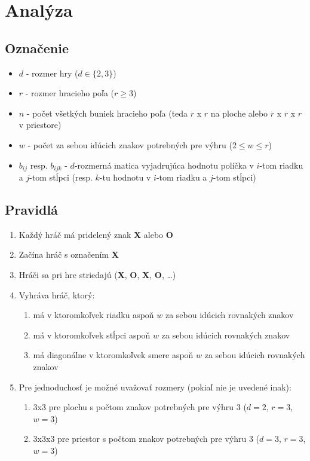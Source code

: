 \section{Analýza}\label{sec:analysis}

\subsection{Označenie}\label{subsec:label}

\begin{itemize}
    \item $d$ - rozmer hry ($d \in \{2,3\}$)
    \item $r$ - rozmer hracieho poľa ($r \geq 3$)
    \item $n$ - počet všetkých buniek hracieho poľa (teda $r$ x $r$ na ploche alebo $r$ x $r$ x $r$ v priestore)
    \item $w$ - počet za sebou idúcich znakov potrebných pre výhru ($2 \leq w \leq r$)
    \item $b_{ij}$ resp. $b_{ijk}$ - $d$-rozmerná matica vyjadrujúca hodnotu políčka v $i$-tom riadku a $j$-tom
    stĺpci (resp. $k$-tu hodnotu v $i$-tom riadku a $j$-tom stĺpci)
\end{itemize}

\subsection{Pravidlá}\label{subsec:rules}

\begin{enumerate}
    \item Každý hráč má pridelený znak \textbf{X} alebo \textbf{O}
    \item Začína hráč s označením \textbf{X}
    \item Hráči sa pri hre striedajú (\textbf{X}, \textbf{O}, \textbf{X}, \textbf{O}, \ldots)
    \item Vyhráva hráč, ktorý:
    \begin{enumerate}
        \item má v ktoromkoľvek riadku aspoň $w$ za sebou idúcich rovnakých znakov
        \item má v ktoromkoľvek stĺpci aspoň $w$ za sebou idúcich rovnakých znakov
        \item má diagonálne v ktoromkoľvek smere aspoň $w$ za sebou idúcich rovnakých znakov
    \end{enumerate}
    \item Pre jednoduchosť je možné uvažovať rozmery (pokiaľ nie je uvedené inak):
    \begin{enumerate}
        \item 3x3 pre plochu s počtom znakov potrebných pre výhru 3 ($d = 2$, $r = 3$, $w = 3$)
        \item 3x3x3 pre priestor s počtom znakov potrebných pre výhru 3 ($d = 3$, $r = 3$, $w = 3$)
    \end{enumerate}
\end{enumerate}

